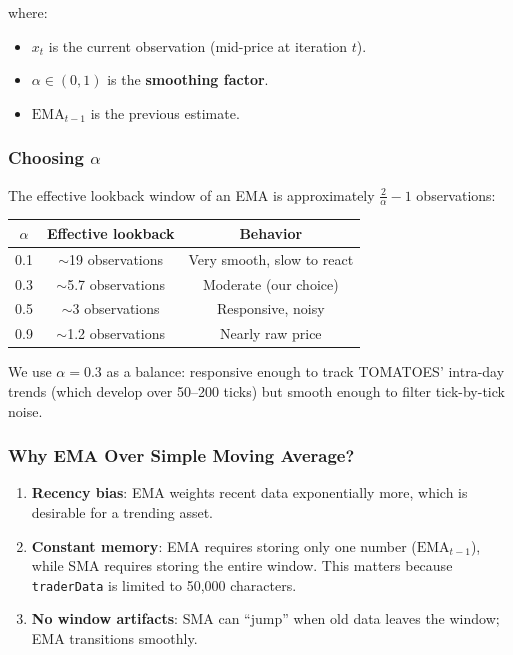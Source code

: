 \documentclass[11pt, letterpaper]{article}
\begin{document}
where:
\begin{itemize}
    \item $x_t$ is the current observation (mid-price at iteration $t$).
    \item $\alpha \in (0, 1)$ is the \textbf{smoothing factor}.
    \item $\text{EMA}_{t-1}$ is the previous estimate.
\end{itemize}

\subsubsection{Choosing $\alpha$}

The effective lookback window of an EMA is approximately $\frac{2}{\alpha} - 1$ observations:

\begin{center}
\begin{tabular}{ccc}
\toprule
$\alpha$ & Effective lookback & Behavior \\
\midrule
0.1 & $\sim$19 observations & Very smooth, slow to react \\
0.3 & $\sim$5.7 observations & Moderate (our choice) \\
0.5 & $\sim$3 observations & Responsive, noisy \\
0.9 & $\sim$1.2 observations & Nearly raw price \\
\bottomrule
\end{tabular}
\end{center}

We use $\alpha = 0.3$ as a balance: responsive enough to track TOMATOES' intra-day trends (which develop over 50--200 ticks) but smooth enough to filter tick-by-tick noise.

\subsubsection{Why EMA Over Simple Moving Average?}

\begin{enumerate}
    \item \textbf{Recency bias}: EMA weights recent data exponentially more, which is desirable for a trending asset.
    \item \textbf{Constant memory}: EMA requires storing only one number ($\text{EMA}_{t-1}$), while SMA requires storing the entire window. This matters because \texttt{traderData} is limited to 50{,}000 characters.
    \item \textbf{No window artifacts}: SMA can ``jump'' when old data leaves the window; EMA transitions smoothly.
\end{enumerate}
\end{document}
